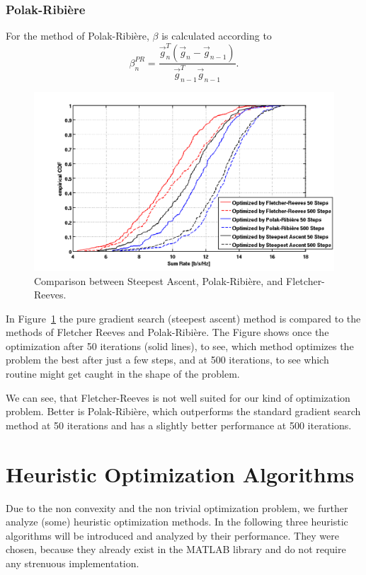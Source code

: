 \subsubsection{Polak-Ribi\`{e}re}
For the method of Polak-Ribi\`{e}re, $\beta$ is calculated according to~\cite{Polak69}
\begin{equation}
\beta_n^{PR} = \frac{\vec{g}_n^T\left(\vec{g}_n-\vec{g}_{n-1}\right)}{\vec{g}_{n-1}^T \vec{g}_{n-1}}.
\label{eq:beta_fr}
\end{equation}

\begin{figure}[h]
\centering
  \includegraphics[width=0.8\linewidth]{images/Conjgradcomparison_edited.png}
\caption{Comparison between Steepest Ascent, Polak-Ribi\`{e}re, and Fletcher-Reeves.}
\label{fig:pr_fr_sa}
\end{figure}

In Figure~\ref{fig:pr_fr_sa} the pure gradient search (steepest ascent) method is compared to the methods of Fletcher Reeves and Polak-Ribi\`{e}re.
The Figure shows once the optimization after 50 iterations (solid lines), to see, which method optimizes the problem the best after just a few steps, and at 500 iterations, to see which routine might get caught in the shape  of the problem.


We can see, that Fletcher-Reeves is not well suited for our kind of optimization problem.
Better is Polak-Ribi\`{e}re, which outperforms the standard gradient search method at 50 iterations and has a slightly better performance at 500 iterations.


\section{Heuristic Optimization Algorithms}
\label{sec:heuristic}
Due to the non convexity and the non trivial optimization problem, we further analyze (some) heuristic optimization methods.
In the following three heuristic algorithms will be introduced and analyzed by their performance.
They were chosen, because they already exist in the MATLAB library and do not require any strenuous implementation.

